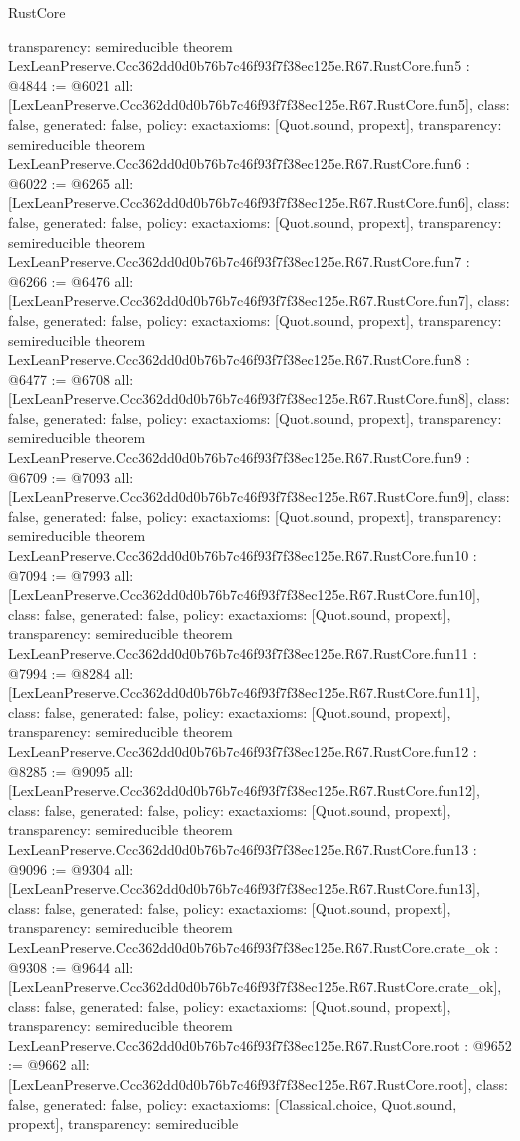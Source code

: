 \begin{lexlean}{RustCore}
\begin{coremodule}
{  transparency: semireducible
}
theorem LexLeanPreserve.Ccc362dd0d0b76b7c46f93f7f38ec125e.R67.RustCore.fun5 : @4844 := @6021 {
  all: [LexLeanPreserve.Ccc362dd0d0b76b7c46f93f7f38ec125e.R67.RustCore.fun5],
  class: false,
  generated: false,
  policy: exact{axioms: [Quot.sound, propext]},
  transparency: semireducible
}
theorem LexLeanPreserve.Ccc362dd0d0b76b7c46f93f7f38ec125e.R67.RustCore.fun6 : @6022 := @6265 {
  all: [LexLeanPreserve.Ccc362dd0d0b76b7c46f93f7f38ec125e.R67.RustCore.fun6],
  class: false,
  generated: false,
  policy: exact{axioms: [Quot.sound, propext]},
  transparency: semireducible
}
theorem LexLeanPreserve.Ccc362dd0d0b76b7c46f93f7f38ec125e.R67.RustCore.fun7 : @6266 := @6476 {
  all: [LexLeanPreserve.Ccc362dd0d0b76b7c46f93f7f38ec125e.R67.RustCore.fun7],
  class: false,
  generated: false,
  policy: exact{axioms: [Quot.sound, propext]},
  transparency: semireducible
}
theorem LexLeanPreserve.Ccc362dd0d0b76b7c46f93f7f38ec125e.R67.RustCore.fun8 : @6477 := @6708 {
  all: [LexLeanPreserve.Ccc362dd0d0b76b7c46f93f7f38ec125e.R67.RustCore.fun8],
  class: false,
  generated: false,
  policy: exact{axioms: [Quot.sound, propext]},
  transparency: semireducible
}
theorem LexLeanPreserve.Ccc362dd0d0b76b7c46f93f7f38ec125e.R67.RustCore.fun9 : @6709 := @7093 {
  all: [LexLeanPreserve.Ccc362dd0d0b76b7c46f93f7f38ec125e.R67.RustCore.fun9],
  class: false,
  generated: false,
  policy: exact{axioms: [Quot.sound, propext]},
  transparency: semireducible
}
theorem LexLeanPreserve.Ccc362dd0d0b76b7c46f93f7f38ec125e.R67.RustCore.fun10 : @7094 := @7993 {
  all: [LexLeanPreserve.Ccc362dd0d0b76b7c46f93f7f38ec125e.R67.RustCore.fun10],
  class: false,
  generated: false,
  policy: exact{axioms: [Quot.sound, propext]},
  transparency: semireducible
}
theorem LexLeanPreserve.Ccc362dd0d0b76b7c46f93f7f38ec125e.R67.RustCore.fun11 : @7994 := @8284 {
  all: [LexLeanPreserve.Ccc362dd0d0b76b7c46f93f7f38ec125e.R67.RustCore.fun11],
  class: false,
  generated: false,
  policy: exact{axioms: [Quot.sound, propext]},
  transparency: semireducible
}
theorem LexLeanPreserve.Ccc362dd0d0b76b7c46f93f7f38ec125e.R67.RustCore.fun12 : @8285 := @9095 {
  all: [LexLeanPreserve.Ccc362dd0d0b76b7c46f93f7f38ec125e.R67.RustCore.fun12],
  class: false,
  generated: false,
  policy: exact{axioms: [Quot.sound, propext]},
  transparency: semireducible
}
theorem LexLeanPreserve.Ccc362dd0d0b76b7c46f93f7f38ec125e.R67.RustCore.fun13 : @9096 := @9304 {
  all: [LexLeanPreserve.Ccc362dd0d0b76b7c46f93f7f38ec125e.R67.RustCore.fun13],
  class: false,
  generated: false,
  policy: exact{axioms: [Quot.sound, propext]},
  transparency: semireducible
}
theorem LexLeanPreserve.Ccc362dd0d0b76b7c46f93f7f38ec125e.R67.RustCore.crate_ok : @9308 := @9644 {
  all: [LexLeanPreserve.Ccc362dd0d0b76b7c46f93f7f38ec125e.R67.RustCore.crate_ok],
  class: false,
  generated: false,
  policy: exact{axioms: [Quot.sound, propext]},
  transparency: semireducible
}
theorem LexLeanPreserve.Ccc362dd0d0b76b7c46f93f7f38ec125e.R67.RustCore.root : @9652 := @9662 {
  all: [LexLeanPreserve.Ccc362dd0d0b76b7c46f93f7f38ec125e.R67.RustCore.root],
  class: false,
  generated: false,
  policy: exact{axioms: [Classical.choice, Quot.sound, propext]},
  transparency: semireducible
}


\end{coremodule}
\end{lexlean}
